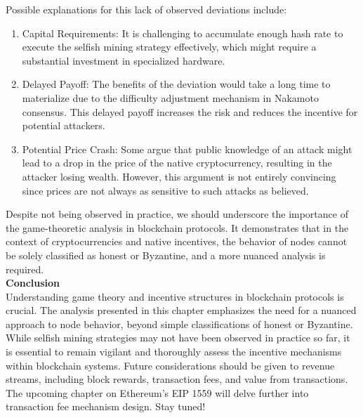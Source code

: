Possible explanations for this lack of observed deviations include:
\begin{enumerate}
    \item Capital Requirements: It is challenging to accumulate enough hash rate to execute the selfish mining strategy effectively, which might require a substantial investment in specialized hardware.
    \item Delayed Payoff: The benefits of the deviation would take a long time to materialize due to the difficulty adjustment mechanism in Nakamoto consensus. This delayed payoff increases the risk and reduces the incentive for potential attackers.
    \item Potential Price Crash: Some argue that public knowledge of an attack might lead to a drop in the price of the native cryptocurrency, resulting in the attacker losing wealth. However, this argument is not entirely convincing since prices are not always as sensitive to such attacks as believed.
\end{enumerate}
Despite not being observed in practice, we should underscore the importance of the game-theoretic analysis in blockchain protocols. It demonstrates that in the context of cryptocurrencies and native incentives, the behavior of nodes cannot be solely classified as honest or Byzantine, and a more nuanced analysis is required.\\

\noindent
\textbf{Conclusion}\\
Understanding game theory and incentive structures in blockchain protocols is crucial. The analysis presented in this chapter emphasizes the need for a nuanced approach to node behavior, beyond simple classifications of honest or Byzantine. While selfish mining strategies may not have been observed in practice so far, it is essential to remain vigilant and thoroughly assess the incentive mechanisms within blockchain systems. Future considerations should be given to revenue streams, including block rewards, transaction fees, and value from transactions. The upcoming chapter on Ethereum's EIP 1559 will delve further into transaction fee mechanism design. Stay tuned!










